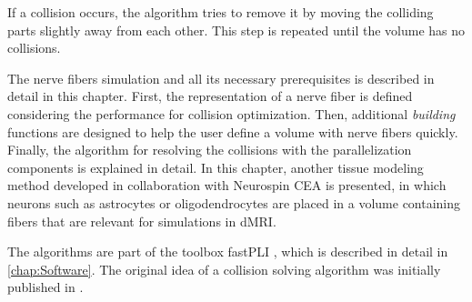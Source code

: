 If a collision occurs, the algorithm tries to remove it by moving the colliding parts slightly away from each other.
This step is repeated until the volume has no collisions.
\par
%
The nerve fibers simulation and all its necessary prerequisites is described in detail in this chapter.
First, the representation of a nerve fiber is defined considering the performance for collision optimization.
Then, additional \textit{building} functions are designed to help the user define a volume with nerve fibers quickly.
Finally, the algorithm for resolving the collisions with the parallelization components is explained in detail.
In this chapter, another tissue modeling method developed in collaboration with Neurospin \ac{CEA} is presented, in which neurons such as astrocytes or oligodendrocytes are placed in a volume containing fibers that are relevant for simulations in \ac{dMRI}.
\par
%
The algorithms are part of the toolbox \ac{fastPLI} \cite{Matuschke2019, Matuschke2021}, which is described in detail in \cref{chap:Software}.
The original idea of a collision solving algorithm was initially published in \cite{Matuschke2019}.
%
%
%
